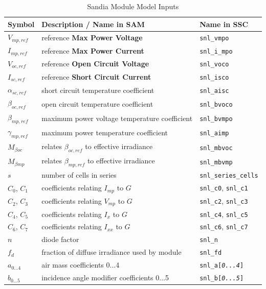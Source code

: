 \documentclass[12pt,letterpaper]{article}
\begin{document}
\begin{table}
\begin{center}
\caption{Sandia Module Model Inputs}
\begin{tabular}{lll}
\midrule
Symbol & Description / \textbf{Name in SAM} & Name in SSC \\
\midrule
$V_{mp,ref}$ & reference \textbf{Max Power Voltage} &\texttt{snl\_vmpo} \\
$I_{mp,ref}$ & reference \textbf{Max Power Current} & \texttt{snl\_i\_mpo} \\
$V_{oc,ref}$ & reference \textbf{Open Circuit Voltage} & \texttt{snl\_voco} \\
$I_{sc,ref}$ & reference \textbf{Short Circuit Current} & \texttt{snl\_isco} \\
$\alpha_{sc,ref}$ & short circuit temperature coefficient & \texttt{snl\_aisc} \\
$\beta_{oc,ref}$ & open circuit temperature coefficient & \texttt{snl\_bvoco} \\
$\beta_{mp,ref}$ & maximum power voltage temperature coefficient & \texttt{snl\_bvmpo} \\
$\gamma_{mp,ref}$ & maximum power temperature coefficient & \texttt{snl\_aimp} \\
$M_{\beta oc}$ & relates $\beta_{oc,ref}$ to effective irradiance& \texttt{snl\_mbvoc} \\
$M_{\beta mp}$ & relates $\beta_{mp,ref}$ to effective irradiance& \texttt{snl\_mbvmp} \\
$s$ & number of cells in series & \texttt{snl\_series\_cells} \\
$C_0$, $C_1$ & coefficients relating $I_{mp}$ to $G$ & \texttt{snl\_c0}, \texttt{snl\_c1} \\
$C_2$, $C_3$ & coefficients relating $V_{mp}$ to $G$ & \texttt{snl\_c2}, \texttt{snl\_c3} \\
$C_4$, $C_5$ & coefficients relating $I_x$ to $G$ & \texttt{snl\_c4}, \texttt{snl\_c5} \\
$C_6$, $C_7$ & coefficients relating $I_{xx}$ to $G$ & \texttt{snl\_c6}, \texttt{snl\_c7} \\
$n$ & diode factor & \texttt{snl\_n} \\
$f_d$ & fraction of diffuse irradiance used by module & \texttt{snl\_fd} \\
$a_{0...4}$ & air mass coefficients 0...4 & \texttt{snl\_a[\textit{0...4}]} \\
$b_{0...5}$ & incidence angle modifier coefficients 0...5 & \texttt{snl\_b[\textit{0...5}]} 
\\
\hline
\end{tabular}
\label{tab-sandiamodulevars}
\end{center}
\end{table}
\end{document}
